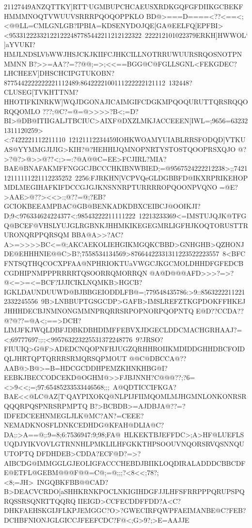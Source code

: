 {{{ 21127449ANZQTTKY]RTT`UGMBUPCHCAEUSXRDKGQFGFDIIKGCBEKFHMMMNOQTVWUUVSRRRPQOQOPPKLO}
 \hbox{BD@>===D====<??<==<;<@@LL=CMLGNLGB?IPBIA=KDSENYDOJQE[GA@EELFQ[EPFBI><953312223321221222487785442211212122322%
 222212101022379ERKH]HWWOL`]aYVUKI?HMJLNDSLVbWWJHSJCKJKIIFCJHKCILLNOTRRUWUURSRQOSNOTPNMMNN}
 \hbox{B?>>=AA??=??@@;=>;<<==BGG@C@FGLLSGNL<FEKGDEC?LHCHEEV]DHSCHCIPGTUKOBN?8775442222222221112489:8642222100111222222121112%
 132448?CLUSEG[TVKHTTNM?HHOTIFKINRKW]WQJDGONAJICAIMGIFCDGKMPQOQURUTTQRSRQQORQQOMLO}
 \hbox{???;@C?=@=@>>>>?B<;=D?BI>@DB@ITIIGALJTBCIUC>AIXF@DXZLMKJACCEEEN[IWL=;9656=632321311120259><:7422221112211110%
 12121112234459IOHKWOAMYUIABLRRSFODQD]VTKUAS@YYMMGJIJIG>KIH?@?HEHHIJQMNOPNRTYSTOSTQOOPRSXQJO}
 \hbox{@?>?@?>@>>@??<;>=:?@A@@C=EE>FCJIRL?MIA?BAE@BNAFAKMFFNGGCJBCCCHKIBNWBIED;=@9567524222212238>;;742112111111221112235252%
 2256:FJRKHN[VCPVQeGLDGBBFD@IKXRPRIKEHOPMDLMEGIHAFKIFDCCGJGJKNSNNRPTURRRROPQOONPVQNO}
 \hbox{=@E?>AAE>@??><<>:;@??=@;?EB?GCIOKBEEAMPBAC@GB@BENKADKDBXCEIBCJ@OOIKJI?D;9<976334624224377<:98543222211111222%
 12213233369<=IMSTUJQJK@TFGQ@BCEF@VHSLYUJGLRGBNKJHHMKIKEGEGMRLIGFHJKOQTORUSTTRURONQRPPQRSQM}
 \hbox{BBA@A>>?AC?A>=>>>>BC<=@;AKCAEKOLIEHGIKMGQKCBBD>GNHGHB>QZHONJDE@EHHHNIE@@C>B?;7558534134569>87664422331311223522223557%
 8<BFCFNTSQTHQCOCXPFAA@NPHRIOKTUaVWGCJKGCMOLDHHDFGFEDCBCGDHIPNMPPPRRRRTQSOORRQMORRQN}
 \hbox{@A@D@@@AFD>>>?=>?@<=>=<=BCF?IJJICIKLNQMKB>HGCB?IGKLDAUNDUUWD@BJBBGEIODDLFB@=;779548435786:>9::85632222112212332245556%
 9B>LNBBUPTGSGCDP>GAFB>IMSLREFZTKGPDOKFFHKEJJHHHDECBJNMNONGMMNPRQRRSRPOPNORPQOPNTQ}
 \hbox{E@D??CCDA??@?@??=@A<;==>DCH?LIMJFKJWQLDBFJDBKDBHDIMFFEBVXJDGECLDDCMACHGRHAAJ?=<;69777697:;:;<995763223225531372248776%
 9?JRSO?FIUUIQ>G@F>ADEDCNQOPNFHJUGZQRHHROIIKMDIDDGHHDBCFOIDQLJHRTQPTQRRRSRMQRSQPMOUT}
 \hbox{@@C@DBCCA@??AAB@>B@>=B=HDCGCDDHPEMZKHNKHBG@I?EEBKJBECCODCEKD@OGHM@>>FJBJNNH?C@@@??;?6=<>9<<;=;97:65485233533446568;;;%
 A@QDTICCIFKGA?BAE<<@LC@AZ[T`QAYPIXOKQ@NLPIJFIIMQOMLMJHGMNLONKONRSRQQQRPQSPNRSRPMPTQ}
 \hbox{B?>BCBDB>=AJDBJA@??=?IDFEDCEEHNMEGLJLK@MC?AN?=CEEE?NEMADKNOSFLDNKCEDHDG@KFAH@DLIA@C?DA;:>A==@;:9=8;6:7536947:9;98;FA@%
 HLKEKTBJEFFDC>;A>HF@LUEFLSUQDJYIKVOVLGTRNNHLPMKLILHFGKKTHPSOOUVNQORSRVQSNNQUUTOPTQ}
 \hbox{DFDHDEB>CDDA?ECF@D?=>?AIBCDG@IMMGGLGJEOLIGFACCCHEBDJBIIKLOQDIRALADDDCBBCDFE@ETFL@GEBM@@@F@@=C@;=@;;;?<8<<;78?;<8;=JH>%
 INGQBKFBB@@CAD?B>DEACVCRDO[aSHHKRNKPOCLNKIGIHDGFJJLHFSFRRPPPQRUPSPQRQSSRSQNRTTQQRQ}
 \hbox{IIEIGD>CCFECDDFFDD?A<C?DHKFAEHSKGIJFLKPJEMGGC?O>?GWECIRFQWPFAEIMANBE@C?FEB?DCHBFNIONJGLGICCJFEEFCDC?F@<;G>9?;>E=AAJJE%
}}}
